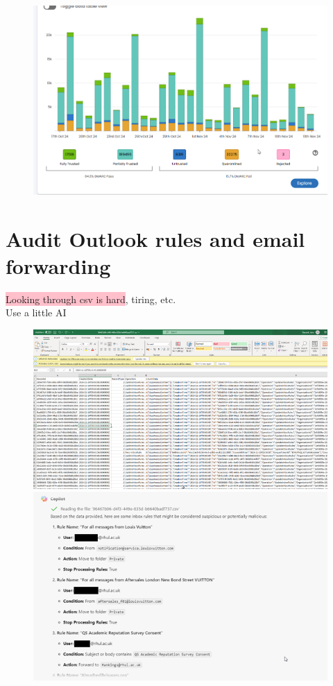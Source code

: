 \documentclass[tikz,border=10pt]{project_plan}
\begin{document}
\begin{figure}[H]
  \centering
  \includegraphics[width=\linewidth]{lots of DMARC.png}
\end{figure}

\section{Audit Outlook rules and email forwarding}

\colorbox{pink}{Looking through csv is hard}, tiring, etc.\\
Use a little AI

\begin{figure}[H]
  \centering
  \includegraphics[width=\linewidth]{Audit Outlook rules and email forwarding 1.png}
  \includegraphics[width=\linewidth]{Audit Outlook rules and email forwarding 2.png}
\end{figure}
\end{document}

